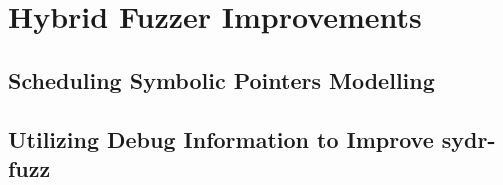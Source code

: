 \section{Hybrid Fuzzer Improvements}
\subsection{Scheduling Symbolic Pointers Modelling}
\subsection{Utilizing Debug Information to Improve sydr-fuzz}